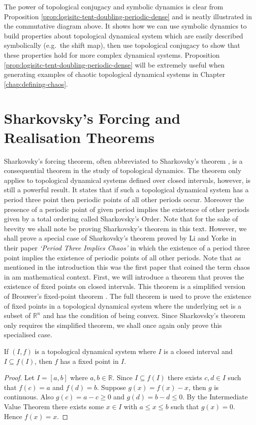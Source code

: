 The power of topological conjugacy and symbolic dynamics is clear from Proposition \ref{prop:logisitc-tent-doubling-periodic-dense} and is neatly illustrated in the commutative diagram above. It shows how we can use symbolic dynamics to build properties about topological dynamical system which are easily described symbolically (e.g.\ the shift map), then use topological conjugacy to show that these properties hold for more complex dynamical systems. Proposition \ref{prop:logisitc-tent-doubling-periodic-dense} will be extremely useful when generating examples of chaotic topological dynamical systems in Chapter \ref{chap:defining-chaos}.

\section{Sharkovsky's Forcing and Realisation Theorems}\label{sec:sharkovskys-theorem-and-type}
Sharkovsky's forcing theorem, often abbreviated to Sharkovsky's theorem \cite{sharkovsky}, is a consequential theorem in the study of topological dynamics. The theorem only applies to topological dynamical systems defined over closed intervals, however, is still a powerful result. It states that if such a topological dynamical system has a period three point then periodic points of all other periods occur. Moreover the presence of a periodic point of given period implies the existence of other periods given by a total ordering called Sharkovsky's Order. Note that for the sake of brevity we shall note be proving Sharkovsky's theorem in this text. However, we shall prove a special case of Sharkovsky's theorem proved by Li and Yorke in their paper \emph{`Period Three Implies Chaos'} \cite{li-yorke} in which the existence of a period three point implies the existence of periodic points of all other periods. Note that as mentioned in the introduction this was the first paper that coined the term chaos in am mathematical context. First, we will introduce a theorem that proves the existence of fixed points on closed intervals. This theorem is a simplified version of Brouwer's fixed-point theorem \cite{brouwer}. The full theorem is used to prove the existence of fixed points in a topological dynamical system where the underlying set is a subset of $\mathbb{R}^n$ and has the condition of being convex. Since Sharkovsky's theorem only requires the simplified theorem, we shall once again only prove this specialised case.

\begin{thm} \label{thm:interval-fixed-points}
    If $(I, f)$ is a topological dynamical system where $I$ is a closed interval and $I \subseteq f(I)$, then $f$ has a fixed point in $I$.
    \begin{proof}
        Let $I = [a, b]$ where $a, b \in \mathbb{R}$. Since $I \subseteq f(I)$ there exists $c, d \in I$ such that $f(c) = a$ and $f(d) = b$. Suppose $g(x) = f(x) - x$, then $g$ is continuous. Also $g(c) = a - c \geq 0$ and $g(d) = b - d \leq 0$. By the Intermediate Value Theorem there exists some $x \in I$ with $a \leq x \leq b$ such that $g(x) = 0$. Hence $f(x) = x$.
    \end{proof}
\end{thm}

